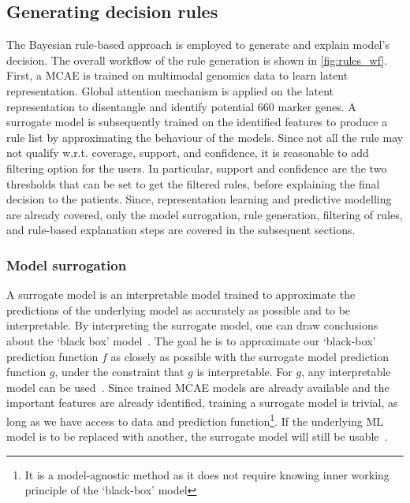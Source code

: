 \subsection{Generating decision rules}
The Bayesian rule-based approach is employed to generate and explain model's decision. The overall workflow of the rule generation is shown in \cref{fig:rules_wf}. First, a MCAE is trained on multimodal genomics data to learn latent representation. Global attention mechanism is applied on the latent representation to disentangle and identify potential 660 marker genes. A surrogate model is subsequently trained on the identified features to produce a rule list by approximating the behaviour of the  models. Since not all the rule may not qualify w.r.t. coverage, support, and confidence, it is reasonable to add filtering option for the users. In particular, support and confidence are the two thresholds that can be set to get the filtered rules, before explaining the final decision to the patients. Since, representation learning and predictive modelling are already covered, only the model surrogation, rule generation, filtering of rules, and rule-based explanation steps are covered in the subsequent sections. 

\subsubsection{Model surrogation}
A surrogate model is an interpretable model trained to approximate the predictions of the underlying model as accurately as possible and to be interpretable. By interpreting the surrogate model, one can draw conclusions about the `black box' model~\cite{molnar2019interpretable}. The goal he is to approximate our `black-box' prediction function $f$ as closely as possible with the surrogate model prediction function $g$, under the constraint that $g$ is interpretable. For $g$, any interpretable model can be used~\cite{molnar2019interpretable}. Since trained MCAE models are already available and the important features are already identified, training a surrogate model is trivial, as long as we have access to data and prediction function\footnote{It is a model-agnostic method as it does not require knowing inner working principle of the `black-box' model}. If the underlying ML model is to be replaced with another, the surrogate model will still be usable~\cite{molnar2019interpretable}. 

